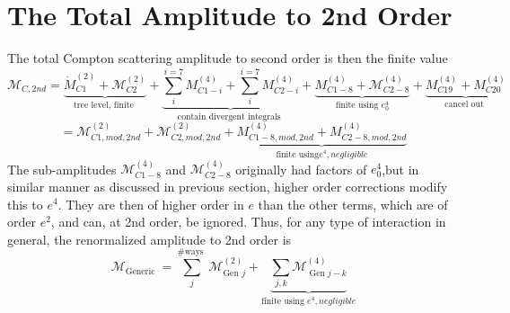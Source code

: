 \section{The Total Amplitude to 2nd Order}
The total Compton scattering amplitude to second order is then the finite value
\begin{equation}
    \mathcal{M}_{C,2nd}=\underbrace{\dot{M}_{C 1}^{(2)}+\mathcal{M}_{C 2}^{(2)}}_{\text {tree level, finite }}+\underbrace{\sum_{i}^{i=7} M_{C 1-i}^{(4)}+\sum_{i}^{i=7} M_{C 2-i}^{(4)}}_{\text {contain divergent integrals }}+\underbrace{M_{C 1-8}^{(4)}+\mathcal{M}_{C 2-8}^{(4)}}_{\text {finite using }e_0^{4}}+\underbrace{M_{C 19}^{(4)}+M_{C 20}^{(4)}}_{\text {cancel out }}
\end{equation}
$$=\mathcal{M}_{C 1,mod,2nd}^{(2)}+\mathcal{M}_{C 2,mod,2nd}^{(2)}+\underbrace{M_{C 1-8,mod,2nd}^{(4)}+M_{C 2-8,mod,2nd}^{(4)}}_{\text{finite using} e^4,negligible}$$
The sub-amplitudes $\mathcal{M}_{C 1-8}^{(4)}$ and $\mathcal{M}_{C 2-8}^{(4)}$ originally had factors of $e_{0}^{4}$,but in similar manner as discussed in previous section, higher order corrections modify this to $e^4$. They are then of higher order in $e$ than the other terms, which are of order $e^2$, and can, at 2nd order, be ignored. Thus, for any type of interaction in general, the renormalized amplitude to 2nd order is
\begin{equation}
\mathcal{M}_{\text {Generic }}=\sum_{j}^{\text {\# ways }} \mathcal{M}_{\text {Gen } j}^{(2)}+\underbrace{\sum_{j, k} \mathcal{M}_{\operatorname{Gen} j-k}^{(4)}}_{\text{finite using }e^4,negligible}
\end{equation}